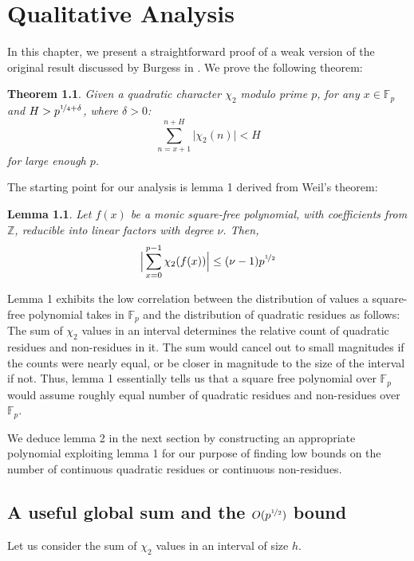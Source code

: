 \documentclass{report}
\newtheorem{lemma}{Lemma}
\newtheorem{theorem}{Theorem}
\begin{document}
\chapter{Qualitative Analysis}
In this chapter, we present a straightforward proof of a weak version of the original result discussed by Burgess in \cite{burgess}. We prove the following theorem:
\begin{theorem} \label{thm:p4bound}
Given a quadratic character $\chi_2$ modulo prime $p$, for any $x\in\mathbb{F}_p$ and $H>p^{\nicefrac{1}{4}+\delta}$, where $\delta>0$:
\[\sum\limits_{n=x+1}^{n+H}\lvert\chi_2(n)\rvert<H\]
for large enough $p$.
\end{theorem}
The starting point for our analysis is lemma 1 derived from Weil's theorem:
%
\begin{lemma}
\cite{burgess}Let $f(x)$ be a monic square-free polynomial, with coefficients from $\mathbb{Z}$, reducible into linear factors with degree $\nu$. Then,
$$\Big\lvert\sum\limits_{x=0}^{p-1}\chi_2(f(x))\Big\rvert\leq (\nu -1)p^{\nicefrac{1}{2}}$$
\end{lemma}
%
Lemma 1 exhibits the low correlation between the distribution of values a square-free polynomial takes in $\mathbb{F}_p$ and the distribution of quadratic residues as follows: The sum of $\chi_2$ values in an interval determines the relative count of quadratic residues and non-residues in it. The sum would cancel out to small magnitudes if the counts were nearly equal, or be closer in magnitude to the size of the interval if not. Thus, lemma 1 essentially tells us that a square free polynomial over $\mathbb{F}_p$ would assume roughly equal number of quadratic residues and non-residues over $\mathbb{F}_p$.

We deduce lemma 2 in the next section by constructing an appropriate polynomial exploiting lemma 1 for our purpose of finding low bounds on the number of continuous quadratic residues or continuous non-residues.
%
%
\section{A useful global sum and the $O(p^{\nicefrac{1}{2}})$ bound}
Let us consider the sum of $\chi_2$ values in an interval of size $h$.
\end{document}
